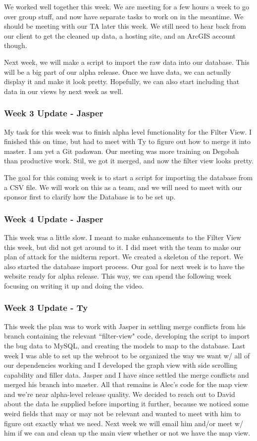 We worked well together this week.
We are meeting for a few hours a week to go over group stuff, and now have separate tasks to work on in the meantime.
We should be meeting with our TA later this week.
We still need to hear back from our client to get the cleaned up data, a hosting site, and an ArcGIS account though.

Next week, we will make  a script to import the raw data into our database.
This will be a big part of our alpha release.
Once we have data, we can actually display it and make it look pretty.
Hopefully, we can also start including that data in our views by next week as well.

\subsubsection{Week 3 Update - Jasper}
My task for this week was to finish alpha level functionality for the Filter View.
I finished this on time, but had to meet with Ty to figure out how to merge it into master.
I am yet a Git padawan.
Our meeting was more training on Degobah than productive work.
Stil, we got it merged, and now the filter view looks pretty.

The goal for this coming week is to start a script for importing the database from a CSV file.
We will work on this as a team, and we will need to meet with our sponsor first to clarify how the Database is to be set up.

\subsubsection{Week 4 Update - Jasper}
This week was a little slow.
I meant to make enhancements to the Filter View this week, but did not get around to it.
I did meet with the team to make our plan of attack for the midterm report.
We created a skeleton of the report.
We also started the database import process.
Our goal for next week is to have the website ready for alpha release.
This way, we can spend the following week focusing on writing it up and doing the video.​

\subsubsection{Week 3 Update - Ty}
This week the plan was to work with Jasper in settling merge conflicts from his branch containing the relevant ``filter-view" code, developing the script to import the bug data to MySQL​, and creating the models to map to the database.
Last week I was able to set up the webroot to be organized the way we want w/ all of our dependencies working and I developed the graph view with side scrolling capability and filler data.
Jasper and I have since settled the merge conflicts and merged his branch into master.
All that remains is Alec's code for the map view and we're near alpha-level release quality.
We decided to reach out to David about the data he supplied before importing it further, because we noticed some weird fields that may or may not be relevant and wanted to meet with him to figure out exactly what we need.
Next week we will email him and/or meet w/ him if we can and clean up the main view whether or not we have the map view.

